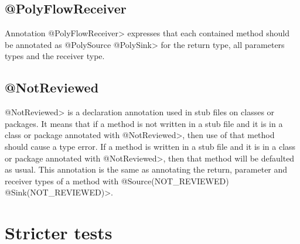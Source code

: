 \subsection{@PolyFlowReceiver\label{sec:polyflowreceiver}}

Annotation \<@PolyFlowReceiver> expresses that each contained method should be
annotated as \<@PolySource @PolySink> for  the return
type, all parameters types and the receiver type.  

\subsection{@NotReviewed\label{sec:notreviewed}}

\<@NotReviewed> is a declaration annotation used in stub files on classes or packages. It means that  if
 a method is not written in a stub file and it is in a class or package annotated with \<@NotReviewed>, then 
 use of that method should cause a type error.  If a method is written in a stub file and it is in a class or 
 package annotated with \<@NotReviewed>, then that method will be defaulted as usual.   This annotation
  is the same as annotating the return, parameter and receiver types of a method with 
  \<@Source(NOT\_REVIEWED) @Sink(NOT\_REVIEWED)>.



%
%
%




\section{Stricter tests\label{sec:stricter}}

